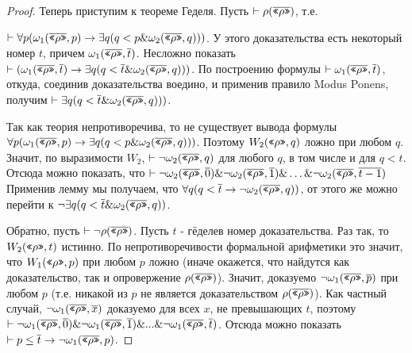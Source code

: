 \begin{proof}

Теперь приступим к теореме Геделя. Пусть $\vdash \rho(\overline{\texttt{<<}\rho\texttt{>>}})$, т.е.

$\vdash \forall p (\omega_1 (\overline{\texttt{<<}\rho\texttt{>>}},p) \rightarrow \exists q (q < p \& \omega_2 (\overline{\texttt{<<}\rho\texttt{>>}},q)))$.
У этого доказательства есть некоторый номер $t$, причем $\omega_1 (\overline{\texttt{<<}\rho\texttt{>>}},\overline{t})$.
Несложно показать $\vdash (\omega_1 (\overline{\texttt{<<}\rho\texttt{>>}},\overline{t}) \rightarrow \exists q (q < \overline{t} \& \omega_2 (\overline{\texttt{<<}\rho\texttt{>>}},q)))$.
По построению формулы $\vdash \omega_1 (\overline{\texttt{<<}\rho\texttt{>>}},\overline{t})$, откуда, соединив
доказательства воедино, и применив правило Modus Ponens, получим 
$\vdash \exists q (q < \overline{t} \& \omega_2 (\overline{\texttt{<<}\rho\texttt{>>}},q)))$.

Так как теория непротиворечива, то не существует вывода формулы 
$\forall p (\omega_1 (\overline{\texttt{<<}\rho\texttt{>>}},p) \rightarrow \exists q (q < p \& \omega_2 (\overline{\texttt{<<}\rho\texttt{>>}},q)))$.
Поэтому $W_2 (\texttt{<<}\rho\texttt{>>}, q)$ ложно при любом $q$. Значит, по выразимости $W_2$, 
$\vdash \neg \omega_2 (\overline{\texttt{<<}\rho\texttt{>>}}, q)$ для любого $q$, в том числе и для $q < t$.
Отсюда можно показать, что 
$\vdash \neg \omega_2(\overline{\texttt{<<}\rho\texttt{>>}},\overline{0}) \& \neg \omega_2(\overline{\texttt{<<}\rho\texttt{>>}},\overline{1}) \& \dots \& \neg \omega_2(\overline{\texttt{<<}\rho\texttt{>>}},\overline{t-1})$
Применив лемму мы получаем, что 
$\forall q (q < \overline{t} \rightarrow \neg \omega_2(\overline{\texttt{<<}\rho\texttt{>>}},q))$,
от этого же можно перейти к
$\neg \exists q (q < \overline{t} \& \omega_2(\overline{\texttt{<<}\rho\texttt{>>}},q))$.

Обратно, пусть $\vdash \neg \rho(\overline{\texttt{<<}\rho\texttt{>>}})$. Пусть $t$ - гёделев номер доказательства.
Раз так, то $W_2 (\texttt{<<}\rho\texttt{>>},t)$ истинно. По непротиворечивости формальной арифметики
это значит, что $W_1 (\texttt{<<}\rho\texttt{>>},p)$ при любом $p$ ложно (иначе окажется, что 
найдутся как доказательство, так и опровержение $\rho(\overline{\texttt{<<}\rho\texttt{>>}})$). 
Значит, доказуемо $\neg \omega_1 (\overline{\texttt{<<}\rho\texttt{>>}},\overline{p})$ при 
любом $p$ (т.е. никакой из $p$ не является доказательством $\rho(\overline{\texttt{<<}\rho\texttt{>>}})$). 
Как частный случай, $\neg \omega_1 (\overline{\texttt{<<}\rho\texttt{>>}},\overline{x})$ доказуемо для
всех $x$, не превышающих $t$, поэтому 
$\vdash \neg \omega_1 (\overline{\texttt{<<}\rho\texttt{>>}},\overline{0}) \& \neg \omega_1 (\overline{\texttt{<<}\rho\texttt{>>}},\overline{1}) \& ... \& \neg \omega_1 (\overline{\texttt{<<}\rho\texttt{>>}},\overline{t})$.
Отсюда можно показать $\vdash p \le \overline{t} \rightarrow \neg \omega_1 (\overline{\texttt{<<}\rho\texttt{>>}},p)$.


\end{proof}
